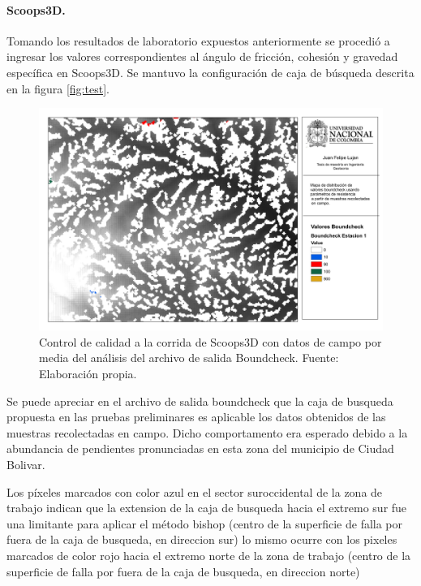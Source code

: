 \paragraph{Scoops3D.}
Tomando los resultados de laboratorio expuestos anteriormente se procedi\'o a ingresar los valores correspondientes al \'angulo de fricci\'on, cohesi\'on y gravedad espec\'ifica en Scoops3D. Se mantuvo la configuraci\'on de caja de b\'usqueda descrita en la figura \ref{fig:test}.

\begin{figure}[H]
\centering
\includegraphics[scale=0.3]{img/boundcheckCampo.pdf}
\caption{Control de calidad a la corrida de Scoops3D con datos de campo por media del an\'alisis del archivo de salida Boundcheck. Fuente: Elaboraci\'on propia.}
\label{fig:dem usado}
\end{figure}

Se puede apreciar en el archivo de salida \textsf{boundcheck} que la caja de busqueda propuesta en las pruebas preliminares es aplicable los datos obtenidos de las muestras recolectadas en campo. Dicho comportamento era esperado debido a la abundancia de pendientes pronunciadas en esta zona del municipio de Ciudad Bolivar.

Los p\'ixeles marcados con color azul en el sector suroccidental de la zona de trabajo indican que la extension de la caja de busqueda hacia el extremo sur fue una limitante para aplicar el m\'etodo bishop (centro de la superficie de falla por fuera de la caja de busqueda, en direccion sur) lo mismo ocurre con los pixeles marcados de color rojo hacia el extremo norte de la zona de trabajo (centro de la superficie de falla por fuera de la caja de busqueda, en direccion norte)

